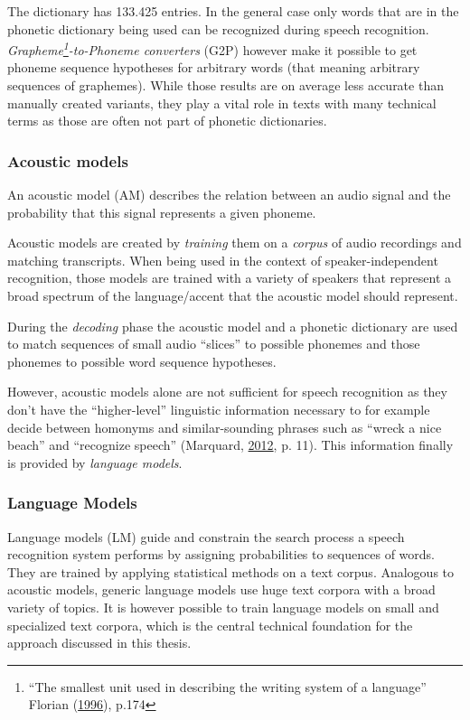 \documentclass[]{article}
\begin{document}
The dictionary has 133.425 entries. In the general case only words that
are in the phonetic dictionary being used can be recognized during
speech recognition. \emph{Grapheme\footnote{``The smallest unit used in
  describing the writing system of a language'' Florian
  (\hyperref[ref-florian1996blackwell]{1996}), p.174}-to-Phoneme
converters} (G2P) however make it possible to get phoneme sequence
hypotheses for arbitrary words (that meaning arbitrary sequences of
graphemes). While those results are on average less accurate than
manually created variants, they play a vital role in texts with many
technical terms as those are often not part of phonetic dictionaries.

\subsubsection{Acoustic models}\label{acoustic-models}

An acoustic model (AM) describes the relation between an audio signal
and the probability that this signal represents a given phoneme.

Acoustic models are created by \emph{training} them on a \emph{corpus}
of audio recordings and matching transcripts. When being used in the
context of speaker-independent recognition, those models are trained
with a variety of speakers that represent a broad spectrum of the
language/accent that the acoustic model should represent.

During the \emph{decoding} phase the acoustic model and a phonetic
dictionary are used to match sequences of small audio ``slices'' to
possible phonemes and those phonemes to possible word sequence
hypotheses.

However, acoustic models alone are not sufficient for speech recognition
as they don't have the ``higher-level'' linguistic information necessary
to for example decide between homonyms and similar-sounding phrases such
as ``wreck a nice beach'' and ``recognize speech'' (Marquard,
\hyperref[ref-marquard]{2012}, p. 11). This information finally is
provided by \emph{language models}.

\subsubsection{Language Models}\label{language-models}

Language models (LM) guide and constrain the search process a speech
recognition system performs by assigning probabilities to sequences of
words. They are trained by applying statistical methods on a text
corpus. Analogous to acoustic models, generic language models use huge
text corpora with a broad variety of topics. It is however possible to
train language models on small and specialized text corpora, which is
the central technical foundation for the approach discussed in this
thesis.
\end{document}
